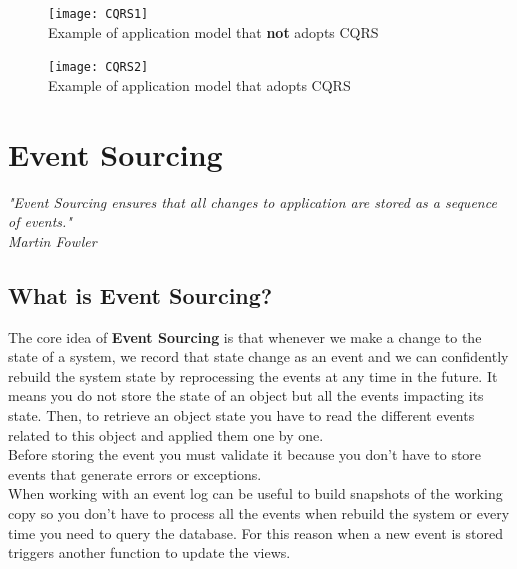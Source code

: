 \documentclass[11pt]{article} %
\begin{document}
\begin{figure} [H]
  \centering
  \texttt{[image: CQRS1]} \\
  Example of application model that \textbf{not} adopts CQRS
\end{figure}
\begin{figure} [H]
  \centering
  \texttt{[image: CQRS2]} \\
  Example of application model that adopts CQRS \\
\end{figure} 

\section{Event Sourcing} 
\begin{center}
	\emph{"Event Sourcing ensures that all changes to application are stored as a sequence of events."  \\Martin Fowler} \\
\end{center}

\subsection{What is Event Sourcing?}
The core idea of \textbf{Event Sourcing} is that whenever we make a change to the state of a system, we record that state change as an event and we can confidently rebuild the system state by reprocessing the events at any time in the future. It means you do not store the state of an object but all the events impacting its state. Then, to retrieve an object state you have to read the different events related to this object and applied them one by one.
\\
Before storing the event you must validate it because you don't have to store events that generate errors or exceptions.\\ 
When working with an event log can be useful to build snapshots of the working copy so you don't have to process all the events when rebuild the system or every time you need to query the database. For this reason when a new event is stored triggers another function to update the views.
\end{document}
